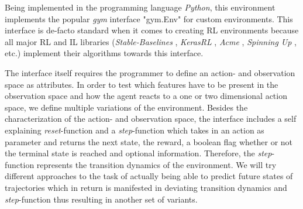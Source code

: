 Being implemented in the programming language \textit{Python}, this environment implements the popular \textit{gym} interface "gym.Env" \cite[]{gym} for custom environments. This interface is de-facto standard when it comes to creating RL environments because all major RL and IL libraries (\textit{Stable-Baselines} \cite[]{stable-baselines3}, \textit{KerasRL} \cite[]{plappert2016kerasrl}, \textit{Acme} \cite[]{hoffman2020acme}, \textit{Spinning Up} \cite[]{SpinningUp2018}, etc.) implement their algorithms towards this interface.
\par
The interface itself requires the programmer to define an action- and observation space as attributes. In order to test which features have to be present in the observation space and how the agent reacts to a one or two dimensional action space, we define multiple variations of the environment. Besides the characterization of the action- and observation space, the interface includes a self explaining \textit{reset}-function and a \textit{step}-function which takes in an action as parameter and returns the next state, the reward, a boolean flag whether or not the terminal state is reached and optional information. Therefore, the \textit{step}-function represents the transition dynamics of the environment. We will try different approaches to the task of actually being able to predict future states of trajectories which in return is manifested in deviating transition dynamics and \textit{step}-function thus resulting in another set of variants.

